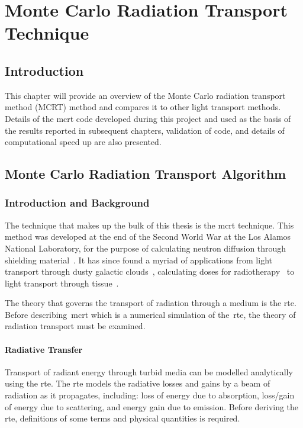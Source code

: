 \chapter{Monte Carlo Radiation Transport Technique}
\label{sec:mcrt}
\section{Introduction}
This chapter will provide an overview of the Monte Carlo radiation transport method (MCRT) method and compares it to other light transport methods. 
Details of the \gls*{mcrt} code developed during this project and used as the basis of the results reported in subsequent chapters, validation of code, and details of computational speed up are also presented.

\section{Monte Carlo Radiation Transport Algorithm}

\subsection{Introduction and Background}
The technique that makes up the bulk of this thesis is the \gls*{mcrt} technique. This method was developed at the end of the Second World War at the Los Alamos National Laboratory, for the purpose of calculating neutron diffusion through shielding material~\cite{montybeg1,eckhardt1987stan,anderson1986metropolis,ulam1947statistical}. It has since found a myriad of applications from light transport through dusty galactic clouds~\cite{wood1999model}, calculating doses for radiotherapy~\cite{rogers1995beam} to light transport through tissue~\cite{1stmonty}.

The theory that governs the transport of radiation through a medium is the \gls*{rte}.
Before describing~\gls*{mcrt} which is a numerical simulation of the~\gls*{rte}, the theory of radiation transport must be examined.

\subsubsection*{Radiative Transfer}
Transport of radiant energy through turbid media can be modelled analytically using the \gls*{rte}. The \gls*{rte} models the radiative losses and gains by a beam of radiation as it propagates, including: loss of energy due to absorption, loss/gain of energy due to scattering, and energy gain due to emission. Before deriving the \gls*{rte}, definitions of some terms and physical quantities is required.



